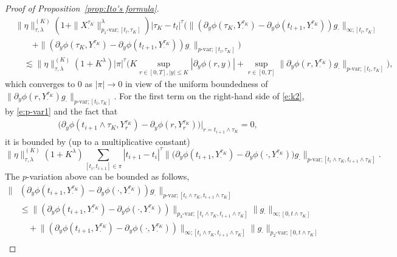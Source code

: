 \documentclass[10pt,a4paper]{amsart}
\begin{document}
\begin{proof}[Proof of Proposition~\ref{prop:Ito's formula}]
\begin{align*}						
&\|\eta\|^{(K)}_{\tau,\lambda}\left(1+\|X^{\tau_{K}}_{\cdot}\|^{\lambda}_{p_{1}\text{-var};[t_{l},\tau_K]}\right)|\tau_K-t_l|^\tau \Big(\|(\partial_{y}\phi(\tau_{K},Y^{\tau_{K}}_{\cdot}) - \partial_{y}\phi(t_{l+1},Y^{\tau_{K}}_{\cdot}))g_{\cdot}\|_{\infty;[t_{l},\tau_{K}]}\\
&\qquad  + \|(\partial_{y}\phi(\tau_{K},Y^{\tau_{K}}_{\cdot}) - \partial_{y}\phi(t_{l+1},Y^{\tau_{K}}_{\cdot}))g_{\cdot}\|_{p\text{-var};[t_{l},\tau_{K}]}\Big)\\
&\quad \lesssim  \|\eta\|^{(K)}_{\tau, \lambda} (1+K^{\lambda})|\pi|^{\tau }\Big( K\sup_{r\in[0,T], |y|\le K}|\partial_{y}\phi(r,y)| + \sup_{r\in[0,T]}\| \partial_{y}\phi(r,Y^{\tau_{K}}_{\cdot})g_{\cdot}\|_{p\text{-var};[t_{l},\tau_{K}]}\Big),
\end{align*}
which converges to 0 as $|\pi|\to0$ in view of the uniform boundedness of $\| \partial_{y}\phi(r,Y^{\tau_{K}}_{\cdot})g_{\cdot}\|_{p\text{-var};[t_{l},\tau_{K}]}$. For the first term on the right-hand side of \eqref{e:k2}, by \eqref{e:p-var1} and the fact that 
\begin{align*}		
\big(\partial_{y}\phi(t_{i+1}\land{\tau_{K}},Y^{\tau_{K}}_{r}) - \partial_{y}\phi(r,Y^{\tau_{K}}_{r})\big)\big|_{r=t_{i+1}\land\tau_{K}}=0, 
\end{align*}
it is bounded by (up to a multiplicative constant)
\begin{equation}\label{e:partial phi1}
\|\eta\|^{(K)}_{\tau, \lambda} (1+K^{\lambda}) \sum_{[t_i, t_{i+1}]\in\pi} |t_{i+1} - t_{i}|^{\tau} \big\|\big(\partial_{y}\phi(t_{i+1},Y^{\tau_{K}}_{\cdot}) - \partial_{y}\phi(\cdot,Y^{\tau_{K}}_{\cdot})\big)g_{\cdot}\big\|_{p\text{-var};[t_{i}\land \tau_{K},t_{i+1}\land \tau_{K}]}.
\end{equation}
The $p$-variation above can be bounded as follows,
\begin{align}	\nonumber
\big\|&(\partial_{y}\phi(t_{i+1},Y^{\tau_{K}}_{\cdot}) - \partial_{y}\phi(\cdot,Y^{\tau_{K}}_{\cdot}))g_{\cdot}\big\|_{p\text{-var};[t_{i}\land \tau_{K},t_{i+1}\land \tau_{K}]}\\ \nonumber
&\le 	\big\|(\partial_{y}\phi(t_{i+1},Y^{\tau_{K}}_{\cdot}) - \partial_{y}\phi(\cdot,Y^{\tau_{K}}_{\cdot}))\big\|_{p_{3}\text{-var};[t_{i}\land\tau_{K},t_{i+1}\land\tau_{K}]}\|g_{\cdot}\|_{\infty ;[0,t\land\tau_{K}]}\\ \label{e:partial phi2}
&\quad +\big\|(\partial_{y}\phi(t_{i+1},Y^{\tau_{K}}_{\cdot}) - \partial_{y}\phi(\cdot,Y^{\tau_{K}}_{\cdot}))\big\|_{\infty;[t_{i}\land\tau_{K},t_{i+1}\land\tau_{K}]}\|g_{\cdot}\|_{p_{2}\text{-var} ;[0,t\land\tau_{K}]}\\ 

\end{align}
\end{proof}
\end{document}
